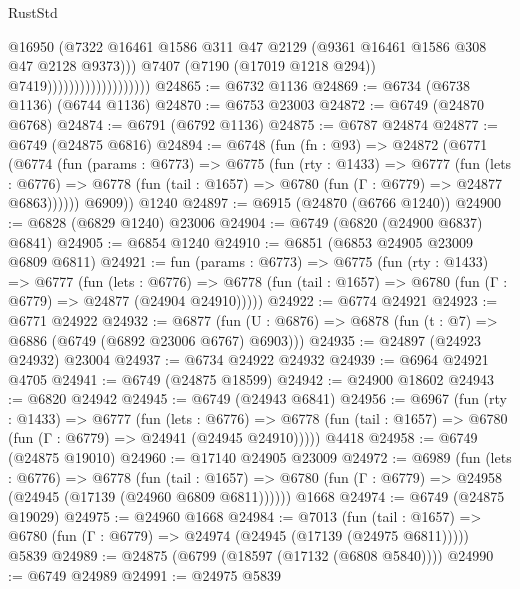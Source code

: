 \begin{lexlean}{RustStd}
\begin{coremodule}
                                            @16950
                                            (@7322
                                              @16461
                                              @1586
                                              @311
                                              @47
                                              @2129
                                              (@9361 @16461 @1586 @308 @47 @2128 @9373)))
                                          @7407
                                          (@7190 (@17019 @1218 @294))
                                          @7419)))))))))))))))))))
@24865 := @6732 @1136
@24869 := @6734 (@6738 @1136) (@6744 @1136)
@24870 := @6753 @23003
@24872 := @6749 (@24870 @6768)
@24874 := @6791 (@6792 @1136)
@24875 := @6787 @24874
@24877 := @6749 (@24875 @6816)
@24894 := @6748
    (fun (fn : @93) =>
    @24872
      (@6771
        (@6774
          (fun (params : @6773) =>
          @6775
            (fun (rty : @1433) =>
            @6777
              (fun (lets : @6776) =>
              @6778 (fun (tail : @1657) => @6780 (fun (Γ : @6779) => @24877 @6863))))))
        @6909))
    @1240
@24897 := @6915 (@24870 (@6766 @1240))
@24900 := @6828 (@6829 @1240) @23006
@24904 := @6749 (@6820 (@24900 @6837) @6841)
@24905 := @6854 @1240
@24910 := @6851 (@6853 @24905 @23009 @6809 @6811)
@24921 := fun (params : @6773) =>
  @6775
    (fun (rty : @1433) =>
    @6777
      (fun (lets : @6776) =>
      @6778 (fun (tail : @1657) => @6780 (fun (Γ : @6779) => @24877 (@24904 @24910)))))
@24922 := @6774 @24921
@24923 := @6771 @24922
@24932 := @6877
    (fun (U : @6876) => @6878 (fun (t : @7) => @6886 (@6749 (@6892 @23006 @6767) @6903)))
@24935 := @24897 (@24923 @24932) @23004
@24937 := @6734 @24922 @24932
@24939 := @6964 @24921 @4705
@24941 := @6749 (@24875 @18599)
@24942 := @24900 @18602
@24943 := @6820 @24942
@24945 := @6749 (@24943 @6841)
@24956 := @6967
    (fun (rty : @1433) =>
    @6777
      (fun (lets : @6776) =>
      @6778 (fun (tail : @1657) => @6780 (fun (Γ : @6779) => @24941 (@24945 @24910)))))
    @4418
@24958 := @6749 (@24875 @19010)
@24960 := @17140 @24905 @23009
@24972 := @6989
    (fun (lets : @6776) =>
    @6778
      (fun (tail : @1657) =>
      @6780 (fun (Γ : @6779) => @24958 (@24945 (@17139 (@24960 @6809 @6811))))))
    @1668
@24974 := @6749 (@24875 @19029)
@24975 := @24960 @1668
@24984 := @7013
    (fun (tail : @1657) => @6780 (fun (Γ : @6779) => @24974 (@24945 (@17139 (@24975 @6811)))))
    @5839
@24989 := @24875 (@6799 (@18597 (@17132 (@6808 @5840))))
@24990 := @6749 @24989
@24991 := @24975 @5839

\end{coremodule}
\end{lexlean}
